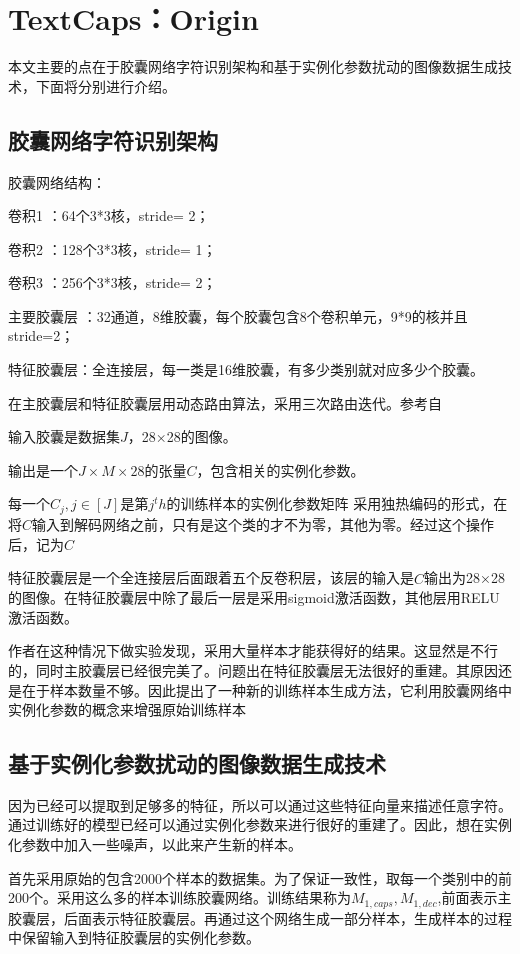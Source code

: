 \section{TextCaps：Origin}
本文主要的点在于胶囊网络字符识别架构和基于实例化参数扰动的图像数据生成技术，下面将分别进行介绍。

\subsection{ 胶囊网络字符识别架构}
胶囊网络结构：

卷积1 ：64个3*3核，stride= 2；

卷积2 ：128个3*3核，stride= 1；

卷积3 ：256个3*3核，stride= 2；

主要胶囊层 ：32通道，8维胶囊，每个胶囊包含8个卷积单元，9*9的核并且stride=2；

特征胶囊层：全连接层，每一类是16维胶囊，有多少类别就对应多少个胶囊。

在主胶囊层和特征胶囊层用动态路由算法，采用三次路由迭代。参考自\cite{sabour2017dynamic}

输入胶囊是数据集$J$，28×28的图像。

输出是一个$J\times M \times28$的张量$C$，包含相关的实例化参数。

每一个$C_j,j\in[J]$是第$j^th$的训练样本的实例化参数矩阵
采用独热编码的形式，在将$C$输入到解码网络之前，只有是这个类的才不为零，其他为零。经过这个操作后，记为$\hat{C}$

特征胶囊层是一个全连接层后面跟着五个反卷积层，该层的输入是$\hat{C}$输出为28×28的图像。在特征胶囊层中除了最后一层是采用sigmoid激活函数，其他层用RELU激活函数。

作者在这种情况下做实验发现，采用大量样本才能获得好的结果。这显然是不行的，同时主胶囊层已经很完美了。问题出在特征胶囊层无法很好的重建。其原因还是在于样本数量不够。因此提出了一种新的训练样本生成方法，它利用胶囊网络中实例化参数的概念来增强原始训练样本

\subsection{基于实例化参数扰动的图像数据生成技术}

因为已经可以提取到足够多的特征，所以可以通过这些特征向量来描述任意字符。通过训练好的模型已经可以通过实例化参数来进行很好的重建了。因此，想在实例化参数中加入一些噪声，以此来产生新的样本。

首先采用原始的包含2000个样本的数据集。为了保证一致性，取每一个类别中的前200个。采用这么多的样本训练胶囊网络。训练结果称为$M_{1,caps},M_{1,dec}$,前面表示主胶囊层，后面表示特征胶囊层。再通过这个网络生成一部分样本，生成样本的过程中保留输入到特征胶囊层的实例化参数。


